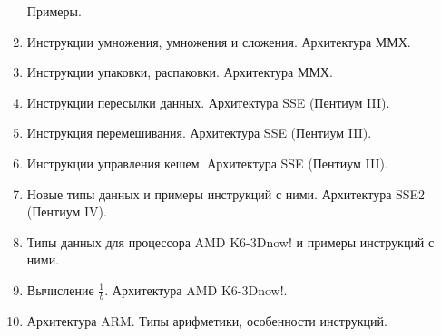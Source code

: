 \documentclass[a4paper,10pt]{article}
\begin{document}
\begin{enumerate}
        Примеры.
  \item Инструкции умножения, умножения и сложения.
        Архитектура ММХ.
  \item Инструкции упаковки, распаковки.
        Архитектура ММХ.
  \item Инструкции пересылки данных.
        Архитектура SSE (Пентиум III).
  \item Инструкция перемешивания.
        Архитектура SSE (Пентиум III).
  \item Инструкции управления кешем.
        Архитектура SSE (Пентиум III).
  \item Новые типы данных и примеры инструкций с ними.
        Архитектура SSE2 (Пентиум IV).
  \item Типы данных для процессора AMD K6-3Dnow! и примеры инструкций с ними.
  \item Вычисление $\frac{1}{b}$.
        Архитектура AMD K6-3Dnow!.
  \item Архитектура ARM.
        Типы арифметики, особенности инструкций.

\end{enumerate}
\end{document}

